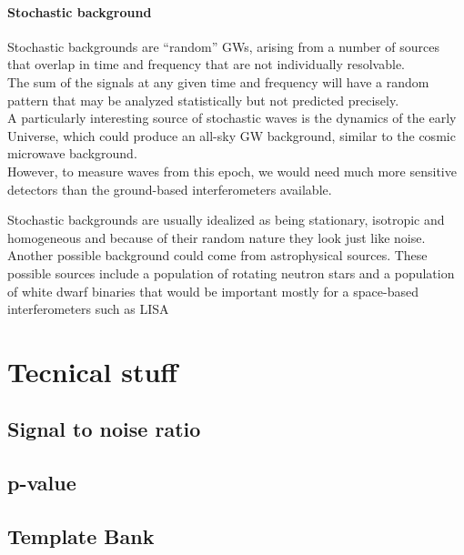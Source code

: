 \documentclass[binding=0.6cm, LaM]{sapthesis}
\begin{document}
\subsubsection{Stochastic background}

	Stochastic backgrounds are “random” GWs, 
	arising from a  number of sources that overlap 
	in time and frequency that are not individually resolvable. \\

	The sum of the signals at any given time and frequency will have 
	a random pattern that may be analyzed statistically but not predicted precisely. \\
	A particularly interesting source of stochastic waves is the dynamics of the early Universe, 
	which could produce an all-sky GW background, 
	similar to the cosmic microwave background. \\
	However, to measure waves from this epoch, 
	we would need much more sensitive detectors than the ground-based interferometers available.
	
	Stochastic backgrounds are usually idealized as being stationary, 
	isotropic and homogeneous and because of their random nature they look just like noise.	\\
	Another possible background could come from astrophysical sources. 
	These possible sources include a population of rotating neutron stars 
	and a population of white dwarf binaries that would be important mostly for a space-based interferometers such as LISA 

\chapter{Tecnical stuff}

\section{Signal to noise ratio}

\section{p-value}

\section{Template Bank}
\end{document}
